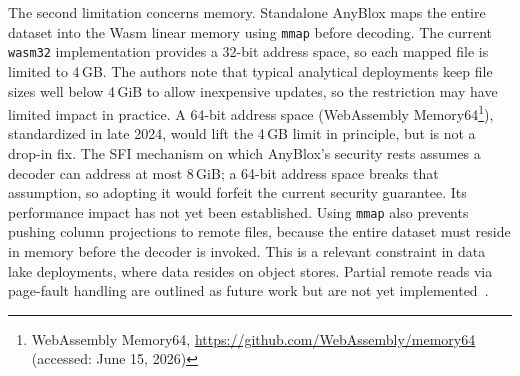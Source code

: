 The second limitation concerns memory. Standalone AnyBlox maps the entire dataset into the Wasm linear memory using \texttt{mmap} before decoding. The current \texttt{wasm32} implementation provides a 32-bit address space, so each mapped file is limited to 4\,GB. The authors note that typical analytical deployments keep file sizes well below 4\,GiB to allow inexpensive updates, so the restriction may have limited impact in practice. A 64-bit address space (WebAssembly Memory64\footnote{WebAssembly Memory64, \url{https://github.com/WebAssembly/memory64} (accessed: June 15, 2026)}), standardized in late 2024, would lift the 4\,GB limit in principle, but is not a drop-in fix. The SFI mechanism on which AnyBlox's security rests assumes a decoder can address at most 8\,GiB; a 64-bit address space breaks that assumption, so adopting it would forfeit the current security guarantee. Its performance impact has not yet been established. Using \texttt{mmap} also prevents pushing column projections to remote files, because the entire dataset must reside in memory before the decoder is invoked. This is a relevant constraint in data lake deployments, where data resides on object stores. Partial remote reads via page-fault handling are outlined as future work but are not yet implemented~\cite{gienieczkoAnyBloxFrameworkSelfDecoding2025}.